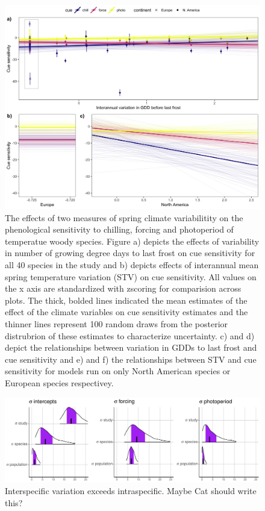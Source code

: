 \documentclass[12pt]{article}\usepackage[]{graphicx}\usepackage[]{color}
\begin{document}
\begin{figure}[h!]
    \centering
 \includegraphics[width=\textwidth]{..//..//analyses/ranges/figures/mock1.jpeg} 
    \caption{ The effects of two measures of spring climate variabilitity on the phenological sensitivity to chilling, forcing and photoperiod of temperatue woody species. Figure a) depicts the effects of variability in number of growing degree days to last frost on cue sensitivity for all 40 species in the study and b) depicts effects of interannual mean spring temperature variation (STV) on cue sensitivity. All values on the x axis are standardized with zscoring for comparision across plots. The thick, bolded lines indicated the mean estimates of the effect of the climate variables on cue sensitivity estimates and the thinner lines represent 100 random draws from the posterior distrubrion of these estimates to characterize uncertainty. c) and d) depict the relationships between variation in GDDs to last frost and cue sensitivity and e) and f) the relationships between STV and cue sensitivity for models run on only North American species or European species respectivey. }
    \label{fig:mods2}
\end{figure}

\begin{figure}[h!]
    \centering
 \includegraphics[width=\textwidth]{..//..//analyses/ranges/figures/variancepartitioning.pdf} 
    \caption{Interspecific variation exceeds intraspecific.  Maybe Cat should write this?}
    \label{fig:popy}
\end{figure}
\end{document}
